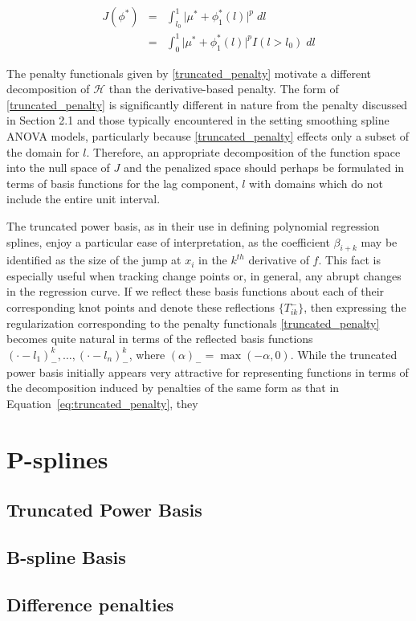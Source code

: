 \documentclass[12pt]{article}
\theoremstyle{definition}
\begin{document}
\begin{eqnarray} \nonumber
J\left(\phi^*\right) &=& \int_{l_0}^1 \vert \mu^* + \phi^*_1\left(l\right) \vert^p\; dl\\
&=& \int_{0}^1 \vert \mu^* + \phi^*_1\left(l\right) \vert^p I\left(l > l_0\right) \; dl \label{eq:truncated_penalty}
\end{eqnarray}

The penalty functionals given by \eqref{truncated_penalty} motivate a different decomposition of $\mathcal{H}$ than the derivative-based penalty. The form of \eqref{truncated_penalty} is significantly different in nature from the penalty discussed in Section 2.1 and those typically encountered in the setting smoothing spline ANOVA models, particularly because \eqref{truncated_penalty} effects only a subset of the domain for $l$. Therefore, an appropriate decomposition of the function space into the null space of $J$ and the penalized space should perhaps be formulated in terms of basis functions for the lag component, $l$ with domains which do not include the entire unit interval. 

The truncated power basis, as in their use in defining polynomial regression splines, enjoy a particular ease of interpretation, as the coefficient $\beta_{i+k}$ may be identified as the size of the jump at $x_i$ in the $k^{th}$ derivative of $f$. This fact is especially useful when tracking change points or, in general, any abrupt changes in the regression curve. If we reflect these basis functions about each of their corresponding knot points and denote these reflections $\lbrace T^-_{ik}\rbrace$, then expressing the regularization corresponding to the penalty functionals \eqref{truncated_penalty} becomes quite natural in terms of the reflected basis functions $\left(\cdot - l_1 \right)^k_-,\dots, \left(\cdot - l_n \right)^k_-$, where $\left( \alpha \right)_- = \max\left(-\alpha,0\right)$.  While the truncated power basis initially appears very attractive for representing functions in terms of the decomposition induced by penalties of the same form as that in Equation~\ref{eq:truncated_penalty}, they 

\section{P-splines}

\subsection{Truncated Power Basis}

\subsection{B-spline Basis}
\subsection{Difference penalties}
\end{document}
